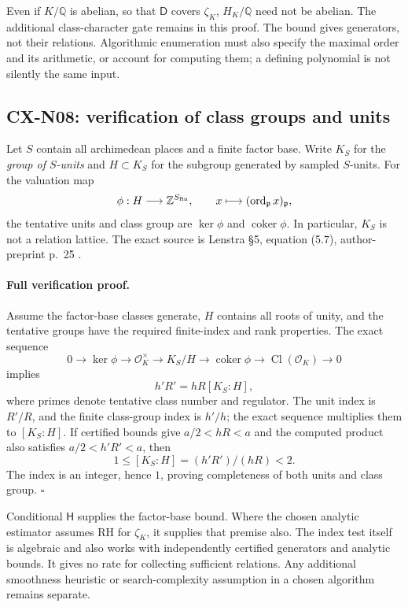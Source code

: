 Even if \(K/\mathbb Q\) is abelian, so that \(\mathsf D\) covers
\(\zeta_K\), \(H_K/\mathbb Q\) need not be abelian. The additional
class-character gate remains in this proof. The bound gives generators,
not their relations. Algorithmic enumeration must also specify the
maximal order and its arithmetic, or account for computing them;
a defining polynomial is not silently the same input.

\subsection{CX-N08: verification of class groups and units}
\label{cx-n08}

Let \(S\) contain all archimedean places and a finite factor base.
Write \(K_S\) for the \emph{group of \(S\)-units} and \(H\subset K_S\)
for the subgroup generated by sampled \(S\)-units. For the valuation map
\[
 \phi:H\longrightarrow\mathbb Z^{S_{\rm fin}},\qquad
 x\longmapsto(\operatorname{ord}_{\mathfrak p}x)_{\mathfrak p},
\]
the tentative units and class group are \(\ker\phi\) and
\(\operatorname{coker}\phi\). In particular, \(K_S\) is not a relation
lattice. The exact source is Lenstra \S5, equation (5.7), author-preprint
p.~25 \cite{CXNLenstra92}.

\paragraph{Full verification proof.}
Assume the factor-base classes generate, \(H\) contains all roots of
unity, and the tentative groups have the required finite-index and rank
properties. The exact sequence
\[
 0\longrightarrow\ker\phi\longrightarrow\mathcal O_K^\times
 \longrightarrow K_S/H\longrightarrow\operatorname{coker}\phi
 \longrightarrow\operatorname{Cl}(\mathcal O_K)\longrightarrow0
\]
implies
\[
                              h'R'=hR[K_S:H],                 \tag{N08.1}
\]
where primes denote tentative class number and regulator.
The unit index is \(R'/R\), and the finite class-group index is
\(h'/h\); the exact sequence multiplies them to \([K_S:H]\).
If certified bounds give \(a/2<hR<a\) and the computed product also
satisfies \(a/2<h'R'<a\), then
\[
                         1\leq[K_S:H]=(h'R')/(hR)<2.
\]
The index is an integer, hence \(1\), proving completeness of both
units and class group. \(\square\)

Conditional \(\mathsf H\) supplies the factor-base bound. Where the
chosen analytic estimator assumes RH for \(\zeta_K\), it supplies
that premise also. The index test itself is algebraic and also works
with independently certified generators and analytic bounds.
It gives no rate for collecting sufficient relations. Any additional
smoothness heuristic or search-complexity assumption in a chosen
algorithm remains separate.

